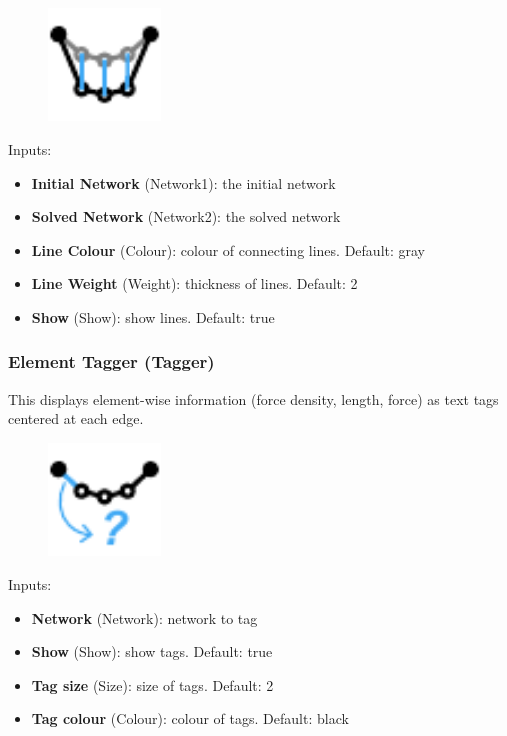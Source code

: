 \begin{figure}[h]
    \centering
    \includegraphics[width = 3cm]{Figures/curvepairs}
\end{figure}

Inputs:
\begin{itemize}
    \setlength\itemsep{0.05em}
    \item \textbf{Initial Network} (Network1): the initial network
    \item \textbf{Solved Network} (Network2): the solved network
    \item \textbf{Line Colour} (Colour): colour of connecting lines. {\color{gray} Default: gray}
    \item \textbf{Line Weight} (Weight): thickness of lines. {\color{gray} Default: 2}
    \item \textbf{Show} (Show): show lines. {\color{gray} Default: true}
\end{itemize}

\subsubsection{Element Tagger (Tagger)}\label{Tagger}
This displays element-wise information (force density, length, force) as text tags centered at each edge.

\begin{figure}[h]
    \centering
    \includegraphics[width=3cm]{Figures/tagger} 
\end{figure}

Inputs:
\begin{itemize}
    \setlength\itemsep{0.05em}
    \item \textbf{Network} (Network): network to tag
    \item \textbf{Show} (Show): show tags. {\color{gray} Default: true}
    \item \textbf{Tag size} (Size): size of tags. {\color{gray} Default: 2}
    \item \textbf{Tag colour} (Colour): colour of tags. {\color{gray} Default:} black
\end{itemize}

